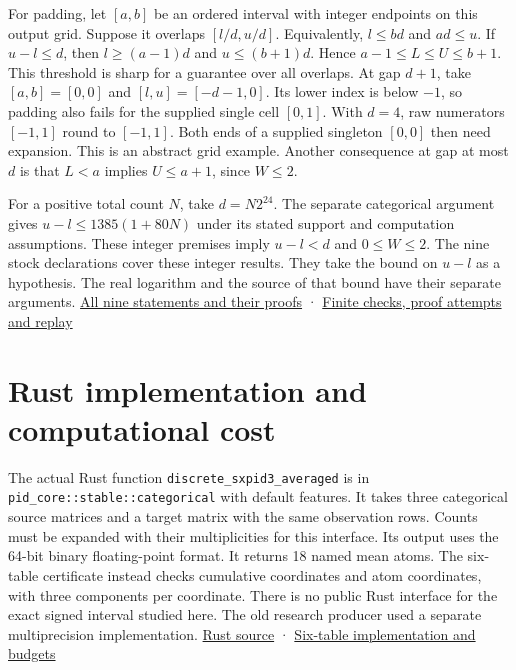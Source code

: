 For padding, let \([a,b]\) be an ordered interval with integer endpoints on this output grid. Suppose it overlaps \([l/d,u/d]\). Equivalently, \(l\le bd\) and \(ad\le u\). If \(u-l\le d\), then \(l\ge(a-1)d\) and \(u\le(b+1)d\). Hence \(a-1\le L\le U\le b+1\). This threshold is sharp for a guarantee over all overlaps. At gap \(d+1\), take \([a,b]=[0,0]\) and \([l,u]=[-d-1,0]\). Its lower index is below \(-1\), so padding also fails for the supplied single cell \([0,1]\). With \(d=4\), raw numerators \([-1,1]\) round to \([-1,1]\). Both ends of a supplied singleton \([0,0]\) then need expansion. This is an abstract grid example. Another consequence at gap at most \(d\) is that \(L<a\) implies \(U\le a+1\), since \(W\le2\).

For a positive total count \(N\), take \(d=N2^{24}\). The separate categorical argument gives \(u-l\le1385(1+80N)\) under its stated support and computation assumptions. These integer premises imply \(u-l<d\) and \(0\le W\le2\). The nine stock declarations cover these integer results. They take the bound on \(u-l\) as a hypothesis. The real logarithm and the source of that bound have their separate arguments. \href{https://github.com/sepahead/pid-rs/blob/main/audit/research/signed-log-certificate-enclosure/grid/Proof.lean}{All nine statements and their proofs} · \href{https://github.com/sepahead/pid-rs/blob/main/audit/research/signed-log-certificate-enclosure/grid/README.md}{Finite checks, proof attempts and replay}

\clearpage

\section{Rust implementation and computational cost}\label{rust-implementation-and-computational-cost}

The actual Rust function \texttt{discrete\_sxpid3\_averaged} is in \texttt{pid\_core::stable::categorical} with default features. It takes three categorical source matrices and a target matrix with the same observation rows. Counts must be expanded with their multiplicities for this interface. Its output uses the 64-bit binary floating-point format. It returns 18 named mean atoms. The six-table certificate instead checks cumulative coordinates and atom coordinates, with three components per coordinate. There is no public Rust interface for the exact signed interval studied here. The old research producer used a separate multiprecision implementation. \href{https://github.com/sepahead/pid-rs/blob/main/crates/pid-core/src/sxpid.rs}{Rust source} · \href{https://github.com/sepahead/pid-rs/blob/main/audit/research/three-source-six-certificate-observations/README.md}{Six-table implementation and budgets}


